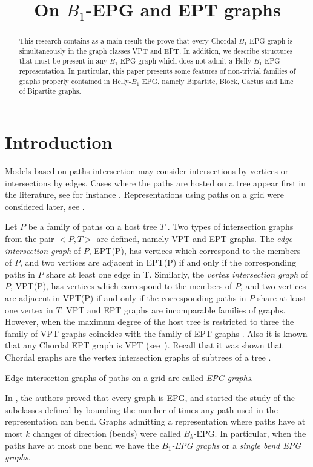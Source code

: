 \documentclass{dmgt}
\title{On $B_1$-EPG  and EPT graphs}
\begin{document}
\begin{abstract}
This research contains  
as a main result the prove that every Chordal $B_1$-EPG graph is simultaneously in the graph classes VPT and EPT. In addition, 
we  describe structures that must be  present in any $B_1$-EPG  graph which does  not admit a Helly-$B_1$-EPG representation. 
In particular, this paper presents  some features of non-trivial families of graphs properly contained in Helly-$B_1$ EPG, namely Bipartite, Block, Cactus and Line of Bipartite  graphs. 
\end{abstract}

\section{Introduction}

Models based on paths intersection  may consider  intersections by vertices or   intersections by edges.  Cases where the paths are hosted on a tree  appear first in the literature, see for instance \cite{gavril1978recognition, golumbic1985edge, golumbic1985}.  Representations using paths on a grid were considered later, see  \cite{golumbic2009,golumbic2013, golumbic2013intersection}. %

 Let $P$ be a family of paths on a host tree $T$ . Two types of intersection graphs from the pair $<P,T>$ are defined, namely VPT and EPT graphs.
The \textit{edge intersection graph} of $P$, EPT(P), has vertices which correspond to the members of $P$, and two vertices are adjacent in EPT(P) if and only if the corresponding paths in $P$ share at least one edge in T. Similarly, the \textit{vertex intersection graph} of $P$, VPT(P), has vertices which correspond to the members of $P$, and two vertices are adjacent in VPT(P) if and only if the corresponding paths in $P$ share at least one vertex in $T$.
%
VPT and EPT graphs are incomparable families of graphs. However, when the maximum degree of the host tree is restricted to three the family of
VPT graphs coincides with the family of EPT graphs \cite{golumbic1985edge%
}. Also it is known that any Chordal EPT graph is VPT (see~\cite{syslo1985triangulated}). Recall that it was shown that Chordal graphs are the vertex intersection graphs of subtrees of a tree \cite{gavril1974intersection}.

Edge intersection graphs of paths on a grid are called \textit{EPG graphs}. 

In \cite{golumbic2009}, the authors proved that every graph is EPG, and started the study of the subclasses
defined by bounding the number of times any path used in the representation can bend.  Graphs admitting a representation
where  paths  have at most $k$ changes of direction  (bends) were called $B_k$-EPG. 
 In particular, when the paths have at most one bend we have the \textit{ $B_1$-EPG graphs} or a \textit{single bend EPG graphs}.
\end{document}
